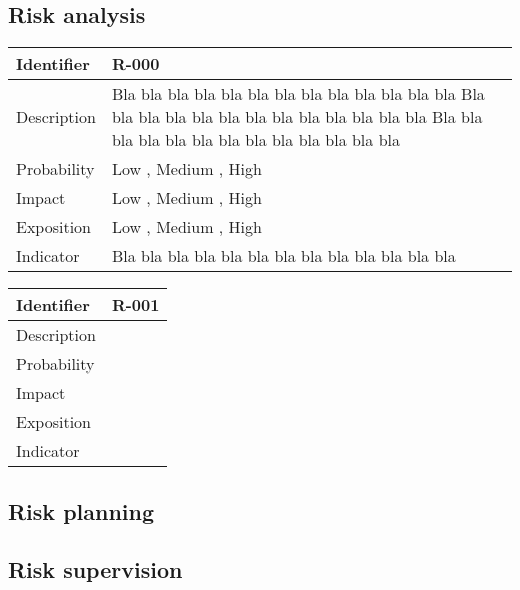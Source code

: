 \subsection{Risk analysis}


\begin{table}[H]
	\begin{tabularx}{\textwidth}{|l|X|}
		\hline
		\rowcolor{gray!30}
		Identifier & \textbf{R-000} \\ \hline
		Description & Bla bla bla bla bla bla bla bla bla bla bla bla bla Bla bla bla bla bla bla bla bla bla bla bla bla bla Bla bla bla bla bla bla bla bla bla bla bla bla bla \\ \hline
		Probability & Low , Medium , High \\ \hline
		Impact & Low , Medium , High \\ \hline
		Exposition & Low , Medium , High \\ \hline
		Indicator & Bla bla bla bla bla bla bla bla bla bla bla bla bla \\ \hline
	\end{tabularx}
\end{table}

\begin{table}[H]
	\begin{tabularx}{\textwidth}{|l|X|}
		\hline
		\rowcolor{gray!30}
		Identifier & \textbf{R-001} \\ \hline
		Description & \\ \hline
		Probability & \\ \hline
		Impact &  \\ \hline
		Exposition &  \\ \hline
		Indicator & \\ \hline
	\end{tabularx}
\end{table}



\subsection{Risk planning}


\subsection{Risk supervision}
